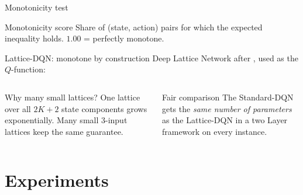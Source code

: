 \documentclass[aspectratio=169, 11pt]{beamer}
\begin{document}
\begin{frame}{Monotonicity test}

  \smallskip
  \begin{block}{Monotonicity score}
    \small Share of (state, action) pairs for which the expected inequality holds.
    $1.00$ = perfectly monotone.
  \end{block}
\end{frame}

\begin{frame}{Lattice-DQN: monotone by construction}
  Deep Lattice Network after \textcite{you2017}, used as the $Q$-function:

  \medskip
  \begin{center}
    \LatticePipeline
  \end{center}

  \vspace{-0.3em}
  \begin{columns}[T]
      \begin{block}{Why many small lattices?}
        \small One lattice over all $2K{+}2$ state components grows exponentially.
        Many small 3-input lattices keep the same guarantee.
      \end{block}
      \begin{block}{Fair comparison}
        \small The Standard-DQN gets the \emph{same number of parameters}
        as the Lattice-DQN in a two Layer framework on every instance.
      \end{block}
  \end{columns}
\end{frame}

\section{Experiments}
\end{document}
